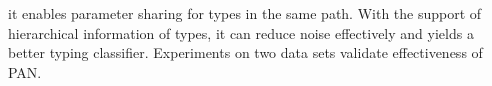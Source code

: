\documentclass[letterpaper]{article} %
\begin{document}
it enables parameter sharing for types in the same path. With the support of hierarchical information of types, %
it can reduce noise effectively and yields a better typing classifier. 
Experiments on two data sets validate effectiveness of PAN. 

\end{document}
